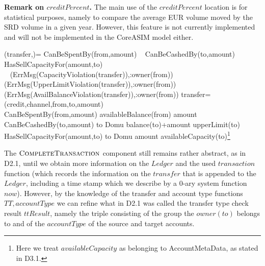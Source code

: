 {\bf Remark on $creditPercent$.} The main use of the $creditPercent$ location is for statistical purposes, namely to compare the average EUR volume moved by the SRD volume in a given year. However, this feature is not currently implemented and will not be implemented in the CoreASIM model either.


\begin{asm}
(transfer,)=\+
   \IF CanBeSpentBy(from,amount) \+
      \THEN ~ \IF CanBeCashedBy(to,amount) \+
         \THEN ~ \IF HasSellCapacityFor(amount,to) \+
            \THEN ~  \\
            \ELSE 
             ~ (ErrMsg(CapacityViolation(transfer)),\TO :owner(from))\-
         \ELSE 
         ~ (ErrMsg(UpperLimitViolation(transfer)),\TO :owner(from))\-
      \ELSE 
      ~ (ErrMsg(AvailBalanceViolation(transfer)),\TO :owner(from))\dec\-
      \WHERE \+
transfer=(credit,channel,from,to,amount)\\
CanBeSpentBy(from,amount) \IFF availableBalance(from) \geq amount \\
CanBeCashedBy(to,amount) \IFF  
    to \not \in Domu \AND balance(to)+amount \leq upperLimit(to) \\
 HasSellCapacityFor(amount,to) \IFF  to \not \in Domu \AND   amount \leq availableCapacity(to)\footnote{Here we treat $availableCapacity$ as belonging to AccountMetaData, as stated in D3.1.}
\end{asm}


The $\hbox{\sc CompleteTransaction}$ component still remains rather abstract, as in D2.1, until we obtain more information on the $Ledger$ and the used  $transaction$ function (which records the information on the $transfer$ that is appended to the $Ledger$, including a time stamp which we describe by a 0-ary system function $now$). However, by the knowledge of the transfer and account type functions $TT, accountType$ we can refine what in D2.1 was called the transfer type check result $ttResult$, namely the triple consisting of the group the $owner(to)$ belongs to and of the $accountType$ of the source and target accounts.

